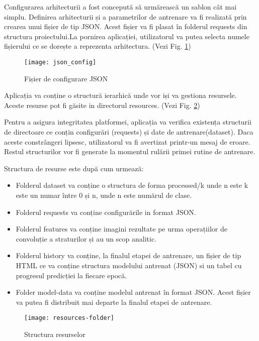 	Configurarea arhitecturii a fost concepută să urmărească un sablon cât mai simplu. Definirea arhitecturii și a parametrilor de antrenare va fi realizată prin crearea unui fișier de tip JSON. 
	Acest fișier va fi plasat în folderul requests din structura proiectului.La pornirea aplicației, utilizatorul va putea selecta numele fișierului ce se dorește a reprezenta arhitectura. (Vezi Fig. \ref{fig:config_json}) 
	
	\begin{figure}[H]
		\texttt{[image: json\_config]}
		\caption{\label{fig:config_json} Fișier de configurare JSON}
	\end{figure}
	
	Aplicația va conține o structură ierarhică unde vor iși va gestiona resursele. Aceste resurse pot fi găsite in directorul resources. (Vezi Fig. \ref{fig:resources-folder})
	
	Pentru a asigura integritatea platformei, aplicația va verifica existența structurii de directoare ce conțin configurări (requests) și date de antrenare(dataset). Daca aceste constrângeri lipsesc, utilizatorul va fi avertizat printr-un mesaj de eroare. Restul structurilor vor fi generate la momentul rulării primei rutine de antrenare.
	
	Structura de resurse este după cum urmează:
	\begin{itemize}
	\item Folderul dataset va conține o structura de forma processed/{k} unde n este k este un numar între 0 și n, unde n este numărul de clase.
	
	\item Folderul requests va conține configurările in format JSON.
	
	\item Folderul features va conține imagini rezultate pe urma operațiilor de convoluție a straturilor și au un scop analitic.
	
	\item Folderul history va conține, la finalul etapei de antrenare, un fișier de tip HTML ce va conține structura modelului antrenat (JSON) si un tabel cu progresul predicției la fiecare epocă.
	
	\item Folder model-data va conține modelul antrenat în format JSON. Acest fișier va putea fi distribuit mai departe la finalul etapei de antrenare.
	
	\end{itemize}
	
	\begin{figure}[H]
		\texttt{[image: resources-folder]}
		\caption{\label{fig:resources-folder} Structura resurselor}
	\end{figure}

